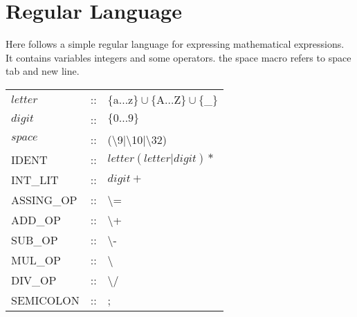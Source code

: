 \chapter{Regular Language}\label{reglang}
Here follows a simple regular language for expressing mathematical expressions.
It contains variables integers and some operators. the space macro refers to
space tab and new line.\\
\begin{tabular}{l c l}
$letter$ & :: & $\{$a$ \dots $z$\} \cup \{$A$ \dots $Z$\} \cup \{$\_$\}$\\
$digit$ & :: & $\{0 \dots 9\}$\\
$space$ & :: & (\textbackslash9|\textbackslash10|\textbackslash32)\\
IDENT & :: & $letter(letter|digit)*$\\
INT\_LIT & :: & $digit+$\\
ASSING\_OP & :: & \textbackslash=\\
ADD\_OP & :: & \textbackslash+\\
SUB\_OP & :: & \textbackslash-\\
MUL\_OP & :: & \textbackslash*\\
DIV\_OP & :: & \textbackslash/\\
SEMICOLON & :: & ;
\end{tabular}
